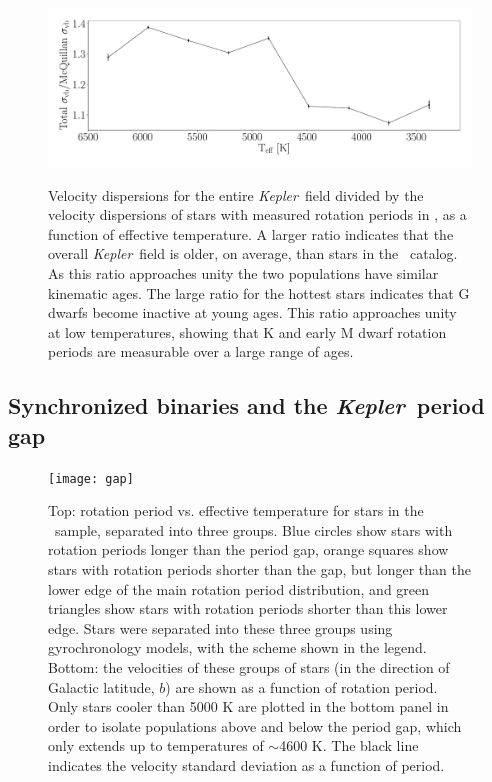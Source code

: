 \documentclass{aastex63}
\newcommand{\kepler}{{\it Kepler}}
\newcommand{\mct}{\citet{mcquillan2014}}
\begin{document}
\begin{figure}
  \caption{
    Velocity dispersions for the entire \kepler\ field divided by the velocity
    dispersions of stars with measured rotation periods in \mct,
    as a function of effective temperature.
    A larger ratio indicates that the overall \kepler\ field is older, on
    average, than stars in the \mct\ catalog.
    As this ratio approaches unity the two populations have similar kinematic
    ages.
    The large ratio for the hottest stars indicates that G dwarfs become
    inactive at young ages.
    This ratio approaches unity at low temperatures, showing that K and early
    M dwarf rotation periods are measurable over a large range of ages.
}
  \centering
    \includegraphics[width=1\textwidth]{field_comparison}
\label{fig:compare}
\end{figure}


\subsection{Synchronized binaries and the \kepler\ period gap}
\label{sec:gap}

\begin{figure}
  \caption{
      Top: rotation period vs. effective temperature for stars in the \mct\
    sample, separated into three groups. Blue circles
      show stars with rotation periods longer than the
    period gap, orange squares show stars with rotation periods shorter than
    the gap, but longer than the lower edge of the main rotation period
    distribution, and green triangles show stars with rotation periods shorter
    than this lower edge.
    Stars were separated into these three groups using \citet{angus2019}
    gyrochronology models, with the scheme shown in the legend.
    Bottom: the velocities of these groups of stars (in the direction of
    Galactic latitude, $b$) are shown as a function of rotation period.
    Only stars cooler than 5000 K are plotted in the bottom panel in order to
    isolate populations above and below the period gap, which only extends up
    to temperatures of $\sim$4600 K.
    The black line indicates the velocity standard deviation as a function of
    period.
}
  \centering
    \texttt{[image: gap]}
\label{fig:gap}
\end{figure}
\end{document}
